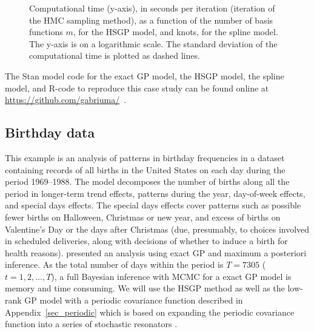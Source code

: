 \begin{figure}[!h]
\centering
{}
\caption{Computational time (y-axis), in seconds per iteration (iteration of the HMC sampling method), as a function of the number of basis functions $m$, for the HSGP model, and knots, for the spline model. The y-axis is on a logarithmic scale. The standard deviation of the computational time is plotted as dashed lines.}
  \label{fig9_rmse_time_exI}
\end{figure}

The Stan model code for the exact GP model, the HSGP model, the spline model, and R-code to reproduce this case study can be found online at {\small \url{ https://github.com/gabriuma/}} \,.


\subsection{Birthday data}\label{sec_birthday}
%
This example is an analysis of patterns in birthday frequencies in a dataset containing records of all births in the United States on each day during the period 1969–1988. The model decomposes the number of births along all the period in longer-term trend effects, patterns during the year, day-of-week effects, and special days effects. The special days effects cover patterns such as possible fewer births on Halloween, Christmas or new year, and excess of births on Valentine’s Day or the days after Christmas (due, presumably, to choices involved in scheduled deliveries, along with decisions of whether to induce a birth for health reasons). \citet{gelman2013bayesian} presented an analysis using exact GP and maximum a posteriori inference. As the total number of days within the period is $T=7305$ ($t=1,2,\dots,T$), a full Bayesian inference with MCMC for a exact GP model is memory and time consuming. We will use the HSGP method as well as the low-rank GP model with a periodic covariance function described in Appendix~\ref{sec_periodic} which is based on expanding the periodic covariance function into a series of stochastic resonators \citep{solin2014explicit}.

